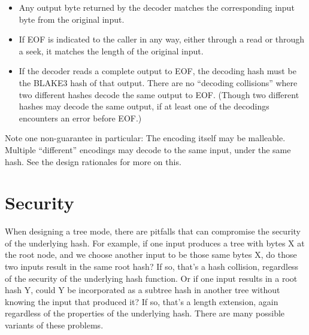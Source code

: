 \documentclass[11pt,notitlepage,a4paper]{article}
\begin{document}
\begin{itemize}
\item Any output byte returned by the decoder matches the corresponding input byte from the original input.
\item If EOF is indicated to the caller in any way, either through a read or through a seek, it matches the length of the original input.
\item If the decoder reads a complete output to EOF, the decoding hash must be the BLAKE3 hash of that output. There are no ``decoding collisions'' where two different hashes decode the same output to EOF. (Though two different hashes may decode the same output, if at least one of the decodings encounters an error before EOF.)
\end{itemize}
Note one non-guarantee in particular: The encoding itself may be malleable. Multiple ``different'' encodings may decode to the same input, under the same hash. See the design rationales for more on this.

\section{Security}\label{sec:security}

When designing a tree mode, there are pitfalls that can compromise the security of the underlying hash. For example, if one input produces a tree with bytes X at the root node, and we choose another input to be those same bytes X, do those two inputs result in the same root hash? If so, that's a hash collision, regardless of the security of the underlying hash function. Or if one input results in a root hash Y, could Y be incorporated as a subtree hash in another tree without knowing the input that produced it? If so, that's a length extension, again regardless of the properties of the underlying hash. There are many possible variants of these problems.
\end{document}
